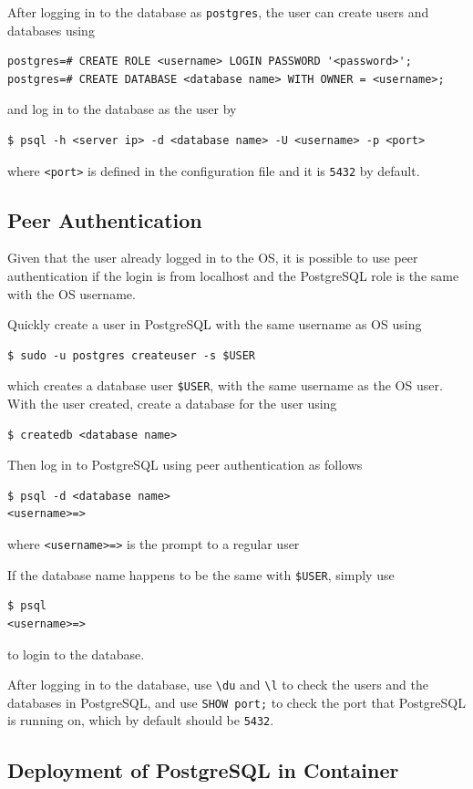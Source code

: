 After logging in to the database as \verb|postgres|, the user can create users and databases using
\begin{lstlisting}
postgres=# CREATE ROLE <username> LOGIN PASSWORD '<password>';
postgres=# CREATE DATABASE <database name> WITH OWNER = <username>;
\end{lstlisting}
and log in to the database as the user by
\begin{lstlisting}
$ psql -h <server ip> -d <database name> -U <username> -p <port>
\end{lstlisting}
where \verb|<port>| is defined in the configuration file and it is \verb|5432| by default.

\subsection{Peer Authentication}

Given that the user already logged in to the OS, it is possible to use peer authentication if the login is from localhost and the PostgreSQL role is the same with the OS username.

Quickly create a user in PostgreSQL with the same username as OS using
\begin{lstlisting}
$ sudo -u postgres createuser -s $USER
\end{lstlisting}
which creates a database user \verb|$USER|, with the same username as the OS user. With the user created, create a database for the user using
\begin{lstlisting}
$ createdb <database name>
\end{lstlisting}
Then log in to PostgreSQL using peer authentication as follows
\begin{lstlisting}
$ psql -d <database name>
<username>=>
\end{lstlisting}
where \verb|<username>=>| is the prompt to a regular user

If the database name happens to be the same with \verb|$USER|, simply use
\begin{lstlisting}
$ psql
<username>=>
\end{lstlisting}
to login to the database.

After logging in to the database, use \verb|\du| and \verb|\l| to check the users and the databases in PostgreSQL, and use \verb|SHOW port;| to check the port that PostgreSQL is running on, which by default should be \verb|5432|.

\subsection{Deployment of PostgreSQL in Container}

